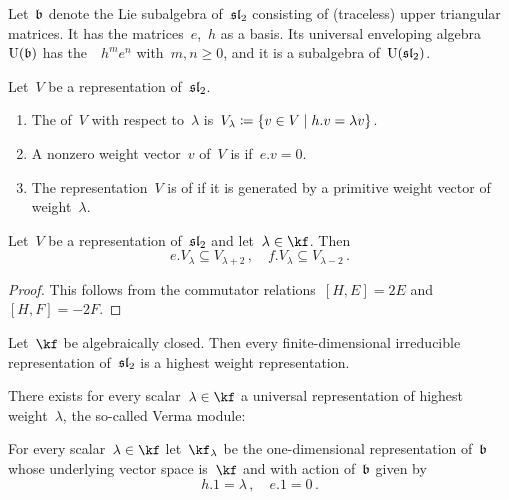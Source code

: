 \documentclass[a4paper, 11pt, oneside]{scrartcl}
\begin{document}
Let~$\mathfrak{b}$ denote the Lie subalgebra of~$\mathfrak{sl}_2$ consisting of (traceless) upper triangular matrices.
It has the matrices~$e$,~$h$ as a basis.
Its universal enveloping algebra~$\operatorname{U}(\mathfrak{b})$ has the~{\PBWbasis}~$h^m e^n$ with~$m, n \geq 0$, and it is a subalgebra of~$\operatorname{U}(\mathfrak{sl}_2)$.

\begin{definition}
  Let~$V$ be a representation of~$\mathfrak{sl}_2$.
  \begin{enumerate}
    \item
      The  of~$V$ with respect to~$\lambda$ is~$V_\lambda \defined \{ v \in V \suchthat h.v = \lambda v \}$.
    \item
      A nonzero weight vector~$v$ of~$V$ is  if~$e.v = 0$.
    \item
      The representation~$V$ is of  if it is generated by a primitive weight vector of weight~$\lambda$.
  \end{enumerate}
\end{definition}

\begin{proposition}
  \label{shifting lemma}
  Let~$V$ be a representation of~$\mathfrak{sl}_2$ and let~$\lambda \in \kf$.
  Then
  \[
    e.V_\lambda
    \subseteq
    V_{\lambda + 2} \,,
    \quad
    f.V_\lambda
    \subseteq
    V_{\lambda - 2} \,.
  \]
\end{proposition}

\begin{proof}
  This follows from the commutator relations~$[H,E] = 2E$ and~$[H,F] = -2F$.
\end{proof}

\begin{lemma}
  Let~$\kf$ be algebraically closed.
  Then every finite-dimensional irreducible representation of~$\mathfrak{sl}_2$ is a highest weight representation.
\end{lemma}

There exists for every scalar~$\lambda \in \kf$ a universal representation of highest weight~$\lambda$, the so-called Verma module: 

\begin{definition}
  For every scalar~$\lambda \in \kf$ let~$\kf_\lambda$ be the one-dimensional representation of~$\mathfrak{b}$ whose underlying vector space is~$\kf$ and with action of~$\mathfrak{b}$ given by
  \[
    h.1 = \lambda \,,
    \quad
    e.1 = 0 \,.
  \]
\end{definition}
\end{document}
